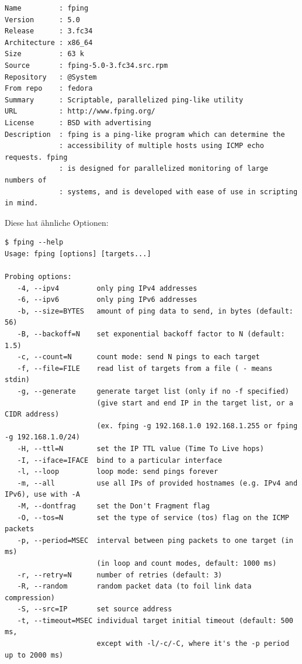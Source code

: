 \begin{verbatim}
Name         : fping
Version      : 5.0
Release      : 3.fc34
Architecture : x86_64
Size         : 63 k
Source       : fping-5.0-3.fc34.src.rpm
Repository   : @System
From repo    : fedora
Summary      : Scriptable, parallelized ping-like utility
URL          : http://www.fping.org/
License      : BSD with advertising
Description  : fping is a ping-like program which can determine the
             : accessibility of multiple hosts using ICMP echo requests. fping
             : is designed for parallelized monitoring of large numbers of
             : systems, and is developed with ease of use in scripting in mind.
\end{verbatim}

Diese hat ähnliche Optionen:

\begin{verbatim}
$ fping --help
Usage: fping [options] [targets...]

Probing options:
   -4, --ipv4         only ping IPv4 addresses
   -6, --ipv6         only ping IPv6 addresses
   -b, --size=BYTES   amount of ping data to send, in bytes (default: 56)
   -B, --backoff=N    set exponential backoff factor to N (default: 1.5)
   -c, --count=N      count mode: send N pings to each target
   -f, --file=FILE    read list of targets from a file ( - means stdin)
   -g, --generate     generate target list (only if no -f specified)
                      (give start and end IP in the target list, or a CIDR address)
                      (ex. fping -g 192.168.1.0 192.168.1.255 or fping -g 192.168.1.0/24)
   -H, --ttl=N        set the IP TTL value (Time To Live hops)
   -I, --iface=IFACE  bind to a particular interface
   -l, --loop         loop mode: send pings forever
   -m, --all          use all IPs of provided hostnames (e.g. IPv4 and IPv6), use with -A
   -M, --dontfrag     set the Don't Fragment flag
   -O, --tos=N        set the type of service (tos) flag on the ICMP packets
   -p, --period=MSEC  interval between ping packets to one target (in ms)
                      (in loop and count modes, default: 1000 ms)
   -r, --retry=N      number of retries (default: 3)
   -R, --random       random packet data (to foil link data compression)
   -S, --src=IP       set source address
   -t, --timeout=MSEC individual target initial timeout (default: 500 ms,
                      except with -l/-c/-C, where it's the -p period up to 2000 ms)


\end{verbatim}
